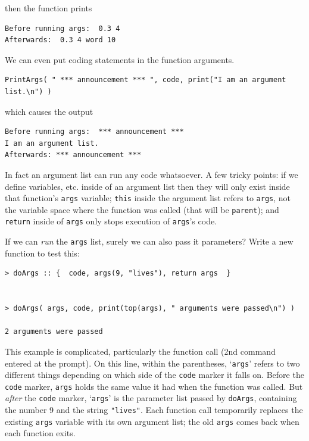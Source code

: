 \documentclass{article}
\newenvironment{code}{
       \begin{list}{}{
               \setlength{\leftmargin}{.4in}
               \setlength{\rightmargin}{0in}
               \setlength{\topsep}{.2in}
       }
       \small
       \item[] }
       { \end{list}   }
\begin{document}
\noindent then the function prints

\begin{code} \begin{verbatim}
Before running args:  0.3 4
Afterwards:  0.3 4 word 10
\end{verbatim} \end{code}

\noindent We can even put coding statements in the function arguments.

\begin{code} \begin{verbatim}
PrintArgs( " *** announcement *** ", code, print("I am an argument list.\n") )
\end{verbatim} \end{code}

\noindent which causes the output

\begin{code} \begin{verbatim}
Before running args:  *** announcement *** 
I am an argument list.
Afterwards: *** announcement *** 
\end{verbatim} \end{code}

\noindent In fact an argument list can run any code whatsoever.  A few tricky points:  if we define variables, etc. inside of an argument list then they will only exist inside that function's \verb#args# variable; \verb#this# inside the argument list refers to \verb#args#, not the variable space where the function was called (that will be \verb#parent#); and \verb#return# inside of \verb#args# only stops execution of \verb#args#'s code.

If we can \emph{run} the \texttt{args} list, surely we can also pass it parameters?  Write a new function to test this:

\begin{code} \begin{verbatim}
> doArgs :: {  code, args(9, "lives"), return args  }


> doArgs( args, code, print(top(args), " arguments were passed\n") )

2 arguments were passed
\end{verbatim} \end{code}

\noindent This example is complicated, particularly the function call (2nd command entered at the prompt).  On this line, within the parentheses, `\texttt{args}' refers to two different things depending on which side of the \verb#code# marker it falls on.  Before the \verb#code# marker, \verb#args# holds the same value it had when the function was called.  But \emph{after} the \verb#code# marker, `\texttt{args}' is the parameter list passed by \texttt{doArgs}, containing the number 9 and the string \verb#"lives"#.  Each function call temporarily replaces the existing \verb#args# variable with its own argument list; the old \verb#args# comes back when each function exits.
\end{document}
